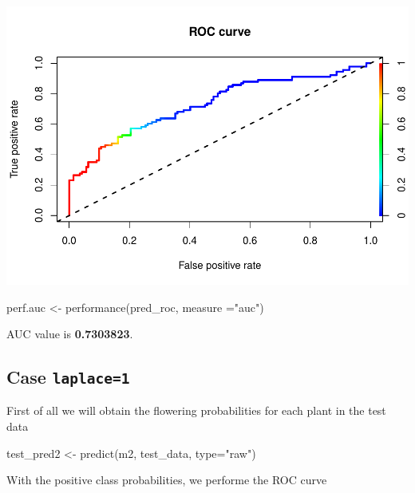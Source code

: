 \documentclass[
]{article}
\newenvironment{Shaded}{\begin{snugshade}}{\end{snugshade}}
\newcommand{\AttributeTok}[1]{\textcolor[rgb]{0.77,0.63,0.00}{#1}}
\newcommand{\FunctionTok}[1]{\textcolor[rgb]{0.00,0.00,0.00}{#1}}
\newcommand{\NormalTok}[1]{#1}
\newcommand{\OtherTok}[1]{\textcolor[rgb]{0.56,0.35,0.01}{#1}}
\newcommand{\StringTok}[1]{\textcolor[rgb]{0.31,0.60,0.02}{#1}}
\begin{document}
\includegraphics{naive_bayes_laura_files/figure-latex/unnamed-chunk-16-1.pdf}

\begin{Shaded}
\begin{Highlighting}[]
\NormalTok{perf.auc }\OtherTok{\textless{}{-}} \FunctionTok{performance}\NormalTok{(pred\_roc, }\AttributeTok{measure =}\StringTok{"auc"}\NormalTok{)}
\end{Highlighting}
\end{Shaded}

AUC value is \textbf{0.7303823}.

\hypertarget{case-laplace1}{%
\subsection{\texorpdfstring{Case
\texttt{laplace=1}}{Case laplace=1}}\label{case-laplace1}}

First of all we will obtain the flowering probabilities for each plant
in the test data

\begin{Shaded}
\begin{Highlighting}[]
\NormalTok{test\_pred2 }\OtherTok{\textless{}{-}} \FunctionTok{predict}\NormalTok{(m2, test\_data, }\AttributeTok{type=}\StringTok{"raw"}\NormalTok{)}
\end{Highlighting}
\end{Shaded}

With the positive class probabilities, we performe the ROC curve
\end{document}
